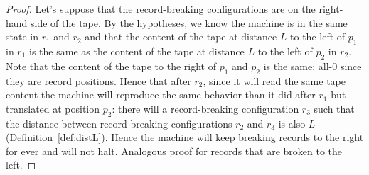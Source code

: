 \begin{proof}\normalfont
Let's suppose that the record-breaking configurations are on the right-hand side of the tape. By the hypotheses, we know the machine is in the same state in $r_1$ and $r_2$ and that the content of the tape at distance $L$ to the left of $p_1$ in $r_1$ is the same as the content of the tape at distance $L$ to the left of $p_2$ in $r_2$. Note that the content of the tape to the right of $p_1$ and $p_2$ is the same: all-0 since they are record positions. Hence that after $r_2$, since it will read the same tape content the machine will reproduce the same behavior than it did after $r_1$ but translated at position $p_2$: there will a record-breaking configuration $r_3$ such that the distance between record-breaking configurations $r_2$ and $r_3$ is also $L$ (Definition~\ref{def:distL}). Hence the machine will keep breaking records to the right for ever and will not halt. Analogous proof for records that are broken to the left.
\end{proof}

